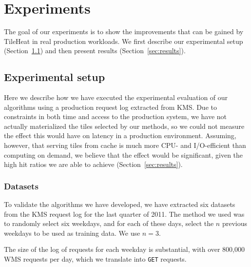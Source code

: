 \documentclass[11pt, oneside]{report}
\begin{document}
\section{Experiments}
\label{sec:experiments}

The goal of our experiments is to show the improvements that can be gained by TileHeat in real production workloads. We first describe our experimental setup (Section~\ref{sec:setup}) and then present results (Section~\ref{sec:results}).  

\subsection{Experimental setup}
\label{sec:setup}

Here we describe how we have executed the experimental evaluation of our algorithms using a production request log extracted from KMS. Due to constraints in both time and access to the production system, we have not actually materialized the tiles selected by our methods, so we could not measure the effect this would have on latency in a production environment. Assuming, however, that serving tiles from cache is much more CPU- and I/O-efficient than computing on demand, we believe that the effect would be significant, given the high hit ratios we are able to achieve (Section~\ref{sec:results}). 

\subsubsection{Datasets}
\label{sec:datasets}
To validate the algorithms we have developed, we have extracted six datasets from the KMS request log for the last quarter of 2011. The method we used was to randomly select six weekdays, and for each of these days, select the $n$ previous weekdays to be used as training data. We use $n=3$. 

%

The size of the log of requests for each weekday is substantial, with over 800,000 WMS requests per day, which we translate into \texttt{GET} requests. 
\end{document}
